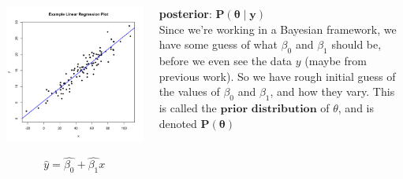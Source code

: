 \documentclass[11pt]{beamer}
\begin{document}

\begin{frame}[t]
\begin{columns}[T] %
\begin{column}{.60\textwidth}
 \includegraphics[scale=0.4]{ExampleLinReg.pdf} 
 {\vspace{-0.1in}}

 \begin{equation*}
 \hat{y} = \hat{\beta_0} + \hat{\beta_1} x
 \end{equation*}

\end{column}%
\hfill%
\begin{column}{.40\textwidth}

 {\textbf{posterior}}: $\mathbf{P(\theta \mid y)}$ \\
 
 \vspace{0.25in}
Since we're working in a Bayesian framework, we have some guess of what $\beta_0$ and $\beta_1$ should be, before we even see the data $y$ (maybe from previous work). So we have rough initial guess of the values of $\beta_0$ and $\beta_1$, and how they vary. This is called the $\textbf{prior distribution}$ of $\theta$, and is denoted $\mathbf{P(\theta)}$

\end{column}%
\end{columns}
\end{frame}
\end{document}
